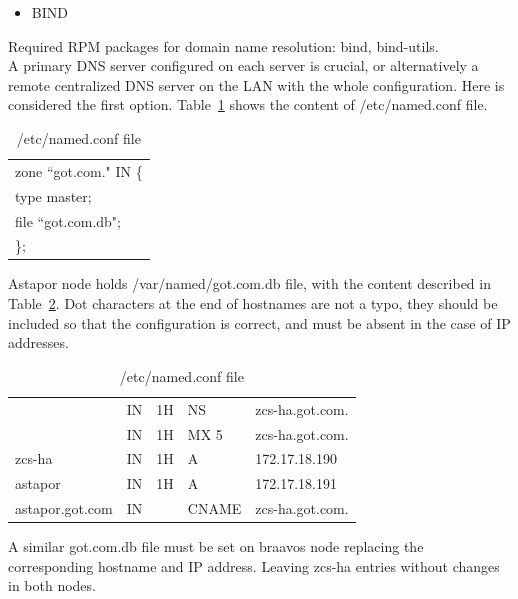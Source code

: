 \documentclass[a4paper, 12pt]{book}
\begin{document}
\begin{itemize}
	\item BIND
\end{itemize}

\noindent Required RPM packages for domain name resolution: bind, bind-utils.\\

\noindent A primary DNS server configured on each server is crucial, or alternatively a remote centralized DNS server on the LAN with the whole configuration. Here is considered the first option. Table~\ref{table:named} shows the content of /etc/named.conf file.

\FloatBarrier
\begin{table}[H]
  \centering
  \begin{tabular}{ | l | }
    \hline
	  zone ``got.com." IN \{ \\
       type master; \\
       file ``got.com.db"; \\
       \}; \\
    \hline
  \end{tabular}
\caption{/etc/named.conf file}
\label{table:named}
\end{table}


\noindent Astapor node holds /var/named/got.com.db file, with the content described in Table~\ref{table:bindastapor}. Dot characters at the end of hostnames are not a typo, they should be included so that the configuration is correct, and must be absent in the case of IP addresses.

\FloatBarrier
\begin{table}[H]
  \centering
  \begin{tabular}{ | l l l l l | }
    \hline
	                  & IN & 1H & NS    & zcs-ha.got.com.\\
                      & IN & 1H & MX 5  & zcs-ha.got.com.\\
      zcs-ha          & IN & 1H & A     & 172.17.18.190\\
      astapor         & IN & 1H & A     & 172.17.18.191\\
      astapor.got.com & IN &    & CNAME & zcs-ha.got.com.\\
    \hline
  \end{tabular}
\caption{/etc/named.conf file}
\label{table:bindastapor}
\end{table}


\noindent A similar got.com.db file must be set on braavos node replacing the corresponding hostname and IP address. Leaving zcs-ha entries without changes in both nodes.
\end{document}

